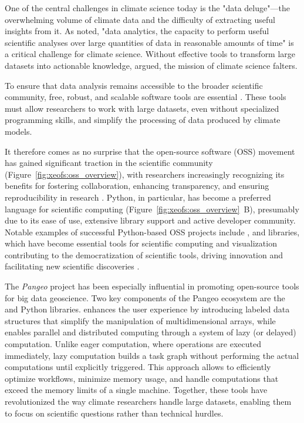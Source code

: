 One of the central challenges in climate science today is the "data deluge"---the overwhelming volume of climate data and the difficulty of extracting useful insights from it. As \citet{schnase_merra_2017} noted, "data analytics, the capacity to perform useful scientific analyses over large quantities of data in reasonable amounts of time" is a critical challenge for climate science. Without effective tools to transform large datasets into actionable knowledge, \citet{schnase_merra_2017} argued, the mission of climate science falters.

To ensure that data analysis remains accessible to the broader scientific community, free, robust, and scalable software tools are essential \cite{easterbrook_engineering_2009}. These tools must allow researchers to work with large datasets, even without specialized programming skills, and simplify the processing of data produced by climate models.

It therefore comes as no surprise that the open-source software (OSS) movement has gained significant traction in the scientific community (Figure~\ref{fig:xeofs:oss_overview}), with researchers increasingly recognizing its benefits for fostering collaboration, enhancing transparency, and ensuring reproducibility in research \cite{krogh_community_2003,ince_case_2012,millman_developing_2018}. Python, in particular, has become a preferred language for scientific computing (Figure~\ref{fig:xeofs:oss_overview}~B), presumably due to its ease of use, extensive library support and active developer community. Notable examples of successful Python-based OSS projects include  \cite{oliphant_python_2007,harris_array_2020},  \cite{oliphant_python_2007,virtanen_scipy_2020} and  \cite{hunter_matplotlib_2007} libraries, which have become essential tools for scientific computing and visualization contributing to the democratization of scientific tools, driving innovation and facilitating new scientific discoveries \cite{sonnenburg_need_2007,hoe_breaking_2006}.

The \textit{Pangeo} project \cite{pangeo} has been especially influential in promoting open-source tools for big data geoscience. Two key components of the Pangeo ecosystem are the  \cite{hoyer_xarray_2017} and  \cite{dask_development_team_dask_2016} Python libraries.  enhances the user experience by introducing labeled data structures that simplify the manipulation of multidimensional arrays, while  enables parallel and distributed computing through a system of lazy (or delayed) computation. Unlike eager computation, where operations are executed immediately, lazy computation builds a task graph without performing the actual computations until explicitly triggered. This approach allows  to efficiently optimize workflows, minimize memory usage, and handle computations that exceed the memory limits of a single machine. Together, these tools have revolutionized the way climate researchers handle large datasets, enabling them to focus on scientific questions rather than technical hurdles.

